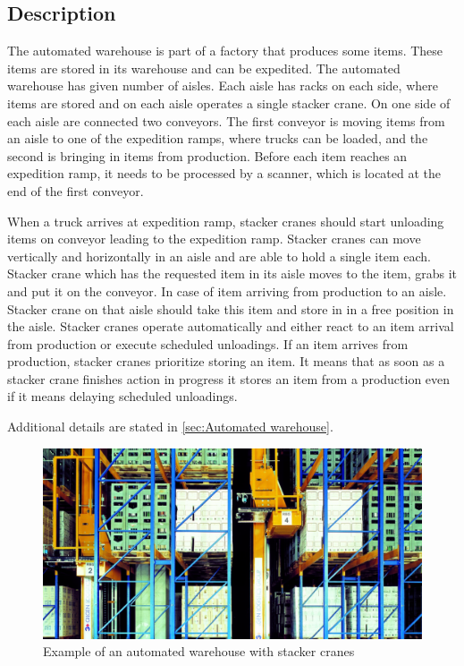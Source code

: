 \documentclass{ctuthesis}
\begin{document}
\subsection{Description}
\label{subsec:Description}
The automated warehouse is part of a factory that produces some items. These items are stored in its warehouse and can be expedited. The automated warehouse has given number of aisles. Each aisle has racks on each side, where items are stored and on each aisle operates a single stacker crane. On one side of each aisle are connected two conveyors. The first conveyor is moving items from an aisle to one of the expedition ramps, where trucks can be loaded, and the second is bringing in items from production. Before each item reaches an expedition ramp, it needs to be processed by a scanner, which is located at the end of the first conveyor.

When a truck arrives at expedition ramp, stacker cranes should start unloading items on conveyor leading to the expedition ramp. Stacker cranes can move vertically and horizontally in an aisle and are able to hold a single item each. Stacker crane which has the requested item in its aisle moves to the item, grabs it and put it on the conveyor. In case of item arriving from production to an aisle. Stacker crane on that aisle should take this item and store in in a free position in the aisle. Stacker cranes operate automatically and either react to an item arrival from production or execute scheduled unloadings. If an item arrives from production, stacker cranes prioritize storing an item. It means that as soon as a stacker crane finishes action in progress it stores an item from a production even if it means delaying scheduled unloadings.

Additional details are stated in \ref{sec:Automated warehouse}.

\begin{figure}
\includegraphics[width=0.8\linewidth]{highbaywarehouse.jpg}
\caption{Example of an automated warehouse with stacker cranes}
\label{fig:foobar}
\end{figure}
\end{document}
